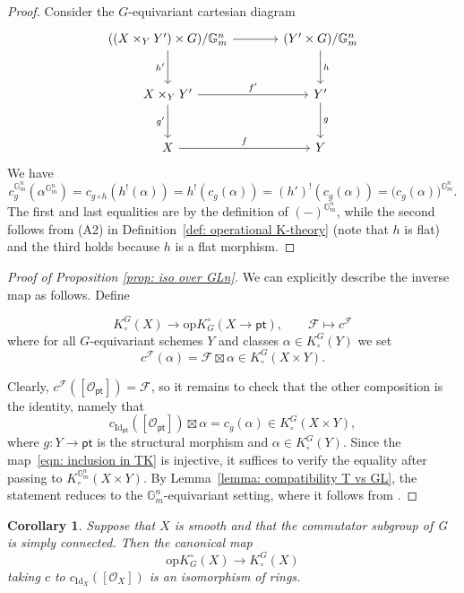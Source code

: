 \documentclass[12pt]{amsart}
\newcommand\Gm{\mathbb{G}_m}
\newcommand{\sF}{\mathscr{F}}
\newcommand{\sO}{\mathscr{O}}
\newcommand{\Kgroup}{K_{\circ}}
\newcommand{\opK}{\mathrm{op}K^{\circ}}
\newtheorem{Corollary}[theorem]{Corollary}
\theoremstyle{definition}
\begin{document}
\begin{proof}
Consider the $G$-equivariant cartesian diagram
    \[
        \begin{tikzcd}[row sep=large, column sep=large]
        ((X \times_Y Y') \times G)/\Gm^n \arrow[r] \arrow[d, "h'"'] & (Y' \times G)/\Gm^n \arrow[d, "h"] \\
        X\times_Y Y' \arrow[r, "f'"] \arrow[d, "g'"'] & Y' \arrow[d, "g"] \\
        X \arrow[r, "f"] & Y
        \end{tikzcd}
    \]
We have
$$
c_g^{\Gm^n}(\alpha^{\Gm^n})=c_{g \circ h}( h^{!}(\alpha))= h^{!}(c_g(\alpha))= (h')^{!}(c_g(\alpha))=\big( c_g(\alpha) \big)^{\Gm^n}.
$$
The first and last equalities are by the definition of $(-)^{\Gm^n}$, while the second follows from (A2) in Definition~\ref{def: operational K-theory} (note that $h$ is flat) and the third holds because $h$ is a flat morphism.
\end{proof}

\begin{proof}[Proof of Proposition \ref{prop: iso over GLn}]

We can explicitly describe the inverse map as follows. Define

$$
\Kgroup^{G}(X) \to \opK_{G}(X \to \mathsf{pt}), \qquad \mathcal{F} \mapsto c^{\mathcal{F}}
$$
where for all $G$-equivariant schemes $Y$ and classes $\alpha \in \Kgroup^{G}(Y)$ we set  
$$
c^{\sF}(\alpha)=\sF \boxtimes \alpha \in \Kgroup^{G}(X \times Y).
$$

Clearly, $c^{\sF}([\sO_{\mathsf{pt}}]) = \sF$, so it remains to check that the other composition is the identity, namely that
\[
c_{\mathrm{Id}_{\mathsf{pt}}}([\sO_{\mathsf{pt}}]) \boxtimes \alpha
= c_g(\alpha) \in \Kgroup^{G}(X \times Y),
\]
where $g \colon Y \to \mathsf{pt}$ is the structural morphism and $\alpha \in \Kgroup^{G}(Y)$. Since the map~\eqref{eqn: inclusion in TK} is injective, it suffices to verify the equality after passing to $\Kgroup^{\Gm^n}(X \times Y)$. By Lemma~\ref{lemma: compatibility T vs GL}, the statement reduces to the $\Gm^n$-equivariant setting, where it follows from \cite[Lemma~2.2]{AndersonPayne-OperationalKtheory}.
\end{proof}

\begin{Corollary}\label{cor: opK=K}
    Suppose that $X$ is smooth and that the commutator subgroup of G is simply connected. Then the canonical map
    $$
    \opK_{G}(X)\longrightarrow \Kgroup^{G}(X)
    $$
    taking $c$ to $c_{\mathrm{Id}_X}([\sO_X])$ is an isomorphism of rings.
\end{Corollary}
\end{document}
